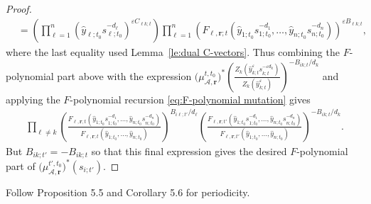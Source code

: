 \documentclass{amsart}
\numberwithin{equation}{section}
\newcommand{\bfr}{{\boldsymbol{r}}}
\newcommand{\cA}{\mathcal{A}}
\newcommand{\cD}{\mathcal{D}}
\newcommand{\cG}{\mathcal{G}}
\newcommand{\cX}{\mathcal{X}}
\begin{document}
\begin{proof}
\begin{align*}
    &=\left(\prod_{\ell=1}^n (\hat y_{\ell;t_0} s_{\ell;t_0}^{-d_\ell})^{\varepsilon C_{\ell k;t}}\right) \prod_{\ell=1}^n \left(F_{\ell,\bfr;t}(\hat y_{1;t_0} s_{1;t_0}^{-d_1},\ldots,\hat y_{n;t_0} s_{n;t_0}^{-d_n})\right)^{\varepsilon B_{\ell k;t}},
  \end{align*}
  where the last equality used Lemma~\ref{le:dual C-vectors}.
  Thus combining the $F$-polynomial part above with the expression $\big(\mu_{\cA,\bfr}^{t,t_0}\big)^*\left(\frac{Z_k\left(\hat y_{k;t}^\varepsilon s_{k;t}^{-\varepsilon d_k}\right)}{Z_k(\hat y_{k;t}^\varepsilon)}\right)^{-B_{ik;t}/d_k}$ and applying the $F$-polynomial recursion \eqref{eq:F-polynomial mutation} gives
  \begin{align*}
    \prod_{\ell\ne k} \left(\frac{F_{\ell,\bfr;t}(\hat y_{1;t_0} s_{1;t_0}^{-d_1},\ldots,\hat y_{n;t_0} s_{n;t_0}^{-d_n})}{F_{\ell,\bfr;t}(\hat y_{1;t_0},\ldots,\hat y_{n;t_0})}\right)^{B_{i\ell;t'}/d_\ell}
    \left(\frac{F_{\ell,\bfr;t'}(\hat y_{1;t_0} s_{1;t_0}^{-d_1},\ldots,\hat y_{n;t_0} s_{n;t_0}^{-d_n})}{F_{\ell,\bfr;t'}(\hat y_{1;t_0},\ldots,\hat y_{n;t_0})}\right)^{-B_{ik;t}/d_k}.
  \end{align*}
  But $B_{ik;t'}=-B_{ik;t}$ so that this final expression gives the desired $F$-polynomial part of $\big(\mu_{\cA,\bfr}^{t',t_0}\big)^*(s_{i;t'})$.
\end{proof}

Follow \cite{GNR17} Proposition 5.5 and Corollary 5.6 for periodicity.

\end{document}
